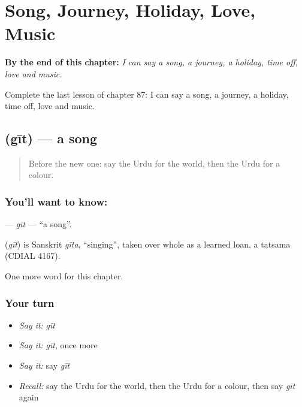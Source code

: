 
\chapter{Song, Journey, Holiday, Love, Music}
\label{ch:ur-song-journey-holiday-love-music}

\begin{chapteropening}
\textbf{By the end of this chapter:} \emph{I can say a song, a journey, a holiday, time off, love and music.}

Complete the last lesson of chapter 87: I can say a song, a journey, a holiday, time off, love and music.
\end{chapteropening}

\section[\texorpdfstring{\ur{گیت} (gīt)}{گیت (gīt)}]{ (gīt) — a song}

\label{lesson:UR-C87-git}



\begin{quote}
Before the new one: say the Urdu for the world, then the Urdu for a colour.
\end{quote}

\subsection*{You'll want to know: }
\textbf{} — \emph{gīt} — \textquotedblleft{}a song\textquotedblright{}.

\begin{cousinweb}
\textbf{} (\emph{gīt}) is Sanskrit \emph{gīta}, \textquotedblleft{}singing\textquotedblright{}, taken over whole as a learned loan, a tatsama (CDIAL 4167).
\end{cousinweb}

\begin{grammarlens}[title={What you've built}]
One more word for this chapter.
\end{grammarlens}

\subsection*{Your turn}
\begin{itemize}
\raggedright
  \item \emph{Say it:} \emph{gīt}
  \item \emph{Say it:} \emph{gīt}, once more
  \item \emph{Say it:} say \emph{gīt}
  \item \emph{Recall:} say the Urdu for the world, then the Urdu for a colour, then say \emph{gīt} again
\end{itemize}

